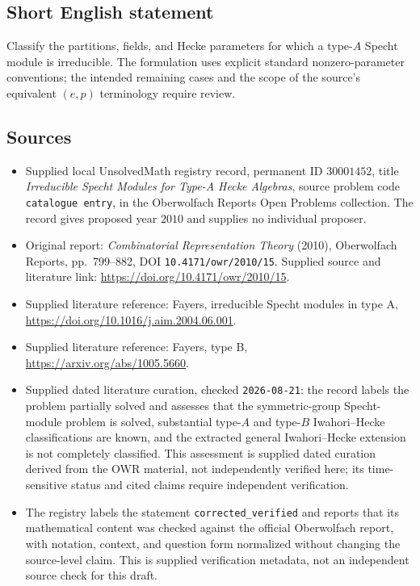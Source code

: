 \documentclass[11pt]{article}
\begin{document}
\subsection{Short English statement}
Classify the partitions, fields, and Hecke parameters for which a type-\(A\) Specht module is irreducible. The formulation uses explicit standard nonzero-parameter conventions; the intended remaining cases and the scope of the source's equivalent \((e,p)\) terminology require review.
\subsection{Sources}
\begin{itemize}
\item Supplied local UnsolvedMath registry record, permanent ID \(30001452\), title \emph{Irreducible Specht Modules for Type-A Hecke Algebras}, source problem code \texttt{catalogue entry}, in the Oberwolfach Reports Open Problems collection. The record gives proposed year \(2010\) and supplies no individual proposer.
\item Original report: \emph{Combinatorial Representation Theory} (2010), Oberwolfach Reports, pp.\ 799--882, DOI \texttt{10.4171/owr/2010/15}. Supplied source and literature link: \url{https://doi.org/10.4171/owr/2010/15}.
\item Supplied literature reference: Fayers, irreducible Specht modules in type A, \url{https://doi.org/10.1016/j.aim.2004.06.001}.
\item Supplied literature reference: Fayers, type B, \url{https://arxiv.org/abs/1005.5660}.
\item Supplied dated literature curation, checked \texttt{2026-08-21}: the record labels the problem partially solved and assesses that the symmetric-group Specht-module problem is solved, substantial type-\(A\) and type-\(B\) Iwahori--Hecke classifications are known, and the extracted general Iwahori--Hecke extension is not completely classified. This assessment is supplied dated curation derived from the OWR material, not independently verified here; its time-sensitive status and cited claims require independent verification.
\item The registry labels the statement \texttt{corrected\_verified} and reports that its mathematical content was checked against the official Oberwolfach report, with notation, context, and question form normalized without changing the source-level claim. This is supplied verification metadata, not an independent source check for this draft.
\end{itemize}
\end{document}
